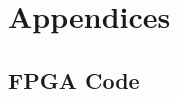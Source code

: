 \documentclass[12pt]{article}
\begin{document}
\section{Appendices}


\subsection{FPGA Code}


%
%
%
%
\vfill
\end{document}
